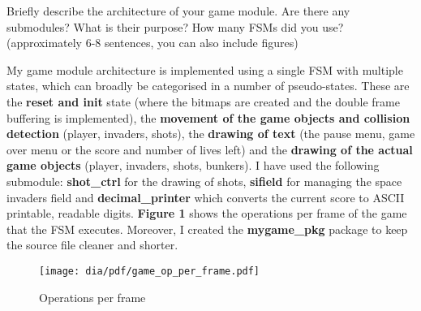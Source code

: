 \documentclass[10pt,a4paper,titlepage,oneside]{article}
\begin{document}
\maketitle



\begin{qa}{Briefly describe the architecture of your \textsf{game} module. Are there any submodules? What is their purpose? How many FSMs did you use? (approximately 6-8 sentences, you can also include figures)}

	My game module architecture is implemented using a single FSM with multiple states, which can broadly be categorised in a number of pseudo-states. These are the \textbf{reset and init} state 
	(where the bitmaps are created and the double frame buffering is implemented), the \textbf{movement of the game objects and collision detection} (player, invaders, shots), the \textbf{drawing of text} 
	(the pause menu, game over menu or the score and number of lives left) and the \textbf{drawing of the actual game objects} (player, invaders, shots, bunkers). I have used the following submodule: 
	\textbf{shot\_ctrl} for the drawing of shots, \textbf{sifield} for managing the space invaders field and \textbf{decimal\_printer} which converts the current score to ASCII printable, readable
	digits. \textbf{Figure 1} shows the operations per frame of the game that the FSM executes. Moreover, I created the \textbf{mygame_pkg} package to keep the source file cleaner and shorter.

	\begin{figure}[h!]
		\centering
		\texttt{[image: dia/pdf/game\_op\_per\_frame.pdf]}
		\caption{Operations per frame}
	\end{figure}
\end{qa}




\end{document}
